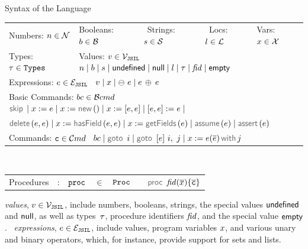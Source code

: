 \begin{display}{Syntax of the \jsil Language}\label{def:jsil-types}
\begin{minipage}{\textwidth}
\begin{tabular}{lllll}
	 Numbers: $n \in \mathcal{N}$ & \quad Booleans: $b \in \mathcal{B}$ & \quad \ Strings: $s \in {\mathcal S}$ & \quad \ Locs: $l \in {\mathcal L}$ & \quad Vars: $x \in \mathcal{X}$ \\[0.1cm]
	Types: $\tau \in \mathtt{Types}$ & \multicolumn{4}{l}{\quad Values: $v \in \mathcal{V}_{\mathtt{JSIL}}$  \ $n \mid b \mid s \mid  {{\sf undefined}} \mid {\sf null} \mid l \mid \tau \mid \mathit{fid} \mid {\sf empty}$} \\[0.1cm]
\multicolumn{5}{l}{Expressions: $e \in \mathcal{E}_{\mathtt{JSIL}}$  \ $v \mid x \mid \ominus\ e \mid e \, \oplus_{} \, e $} \\[0.1cm]
	\multicolumn{5}{l}{Basic Commands: $bc \in \mathcal{B}cmd$ \ $\jsilskip \mid \jvar := \jsilexpr  \mid \jvar := \jsilnew() \mid \jvar := [\jsilexpr, \jsilexpr] \mid [\jsilexpr, \jsilexpr] := \jsilexpr \mid$} \\[0.1cm]
	\multicolumn{5}{l}{\hspace{1.35cm} $\jsildelete(\jsilexpr, \jsilexpr) \mid \jvar := \hasfield(\jsilexpr, \jsilexpr) \mid \jvar := \getfields(\jsilexpr) \mid \assume(\jsilexpr) \mid \assert(\jsilexpr)$} \\[0.1cm]
	\multicolumn{5}{l}{Commands: $\mathtt{c} \in \mathcal{C}md$  \ $ \bcmd \mid \goto \ i \mid  \ifgoto{\jsilexpr}{i}{j} \mid \jsilcall{\jvar}{\jsilexpr}{\jvec{\jsilexpr}}{j}$} 
 \end{tabular} \\[0.1cm]
 \begin{tabular}{rcrclcl}
 	Procedures & : & $\mathtt{proc}$ & $\in$ & $\mathtt{Proc}$ && $\procedure{\fid}{\jvec{\jvar}}{\jvec{\ivlcmd}}$ \\[0.1cm]
 \end{tabular}
 \end{minipage}
 \end{display}
 
\jsil \emph{values}, $v \in \mathcal{V}_{\mathtt{JSIL}}$, include numbers, booleans, strings, the special values ${{\sf undefined}}$ and ${\sf null}$, as well as types~$\tau$, procedure identifiers $\mathit{fid}$, and the special value ${\sf empty}$. 
\jsil~\emph{expressions}, $e \in \mathcal{E}_{\mathtt{JSIL}}$, include \jsil values, \jsil program variables $x$, and various unary and binary operators, which, for instance, provide support for sets and lists. 


